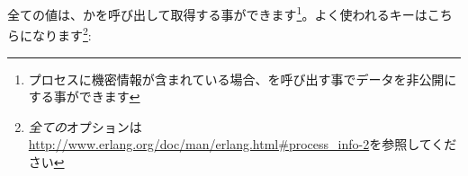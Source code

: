 全ての値は、か\newline {}を呼び出して取得する事ができます\footnote{プロセスに機密情報が含まれている場合、を呼び出す事でデータを非公開にする事ができます}。よく使われるキーはこちらになります\footnote{\emph{全ての}オプションは \href{http://www.erlang.org/doc/man/erlang.html\#process\_info-2}{http://www.erlang.org/doc/man/erlang.html\#process\_info-2}を参照してください}:

